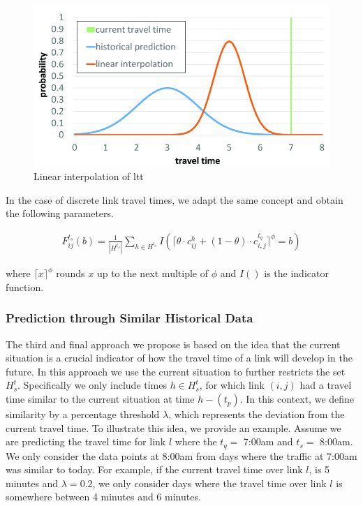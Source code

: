 \begin{figure}[h]
    \centering
    \includegraphics[width=0.80\columnwidth]{figures/tt_interpolation.jpg}
    \caption{Linear interpolation of ltt}
    \label{fig:interpolation}
\end{figure}

In the case of discrete link travel times, we adapt the same concept and obtain the following parameters.

\begin{gather}
F_{ij}^{t_s}(b) = \frac{1}{|H^{t_s}|}\sum_{h\in H^{t_s}} I(\lceil\theta \cdot 
c_{ij}^h + (1-\theta)\cdot c_{i,j}^{t_q}\rceil^\phi = b)
\end{gather}

where $\lceil x \rceil^\phi$ rounds $x$ up to the next multiple of $\phi$ and $I()$ is the indicator function.

\subsubsection{Prediction through Similar Historical Data}
\label{subsec:SH}
The third and final approach we propose is based on the idea that the current situation is a crucial indicator of how the travel time of a link will develop in the future. In this approach we use the current situation to further restricts the set $H^t_s$. Specifically we only include times $h \in H^t_s$, for which link $(i, j)$ had a travel time similar to the current situation at time $h-(t_p)$. In this context, we define similarity by a percentage threshold $\lambda$, which represents the deviation from the current travel time. To illustrate this idea, we provide an example. Assume we are predicting the travel time for link $l$ where the $t_q=$ 7:00am and $t_s=$ 8:00am. We only consider the data points at 8:00am from days where the traffic at 7:00am was similar to today. For example, if the current travel time over link $l$, is 5 minutes and $\lambda = 0.2$, we only consider days where the travel time over link $l$ is somewhere between 4 minutes and 6 minutes.

